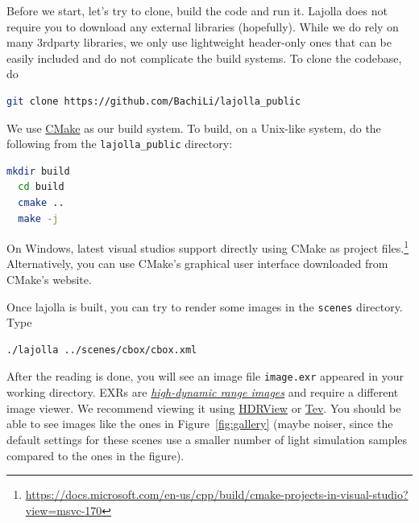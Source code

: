 Before we start, let's try to clone, build the code and run it. Lajolla does not require you to download any external libraries (hopefully). While we do rely on many 3rdparty libraries, we only use lightweight header-only ones that can be easily included and do not complicate the build systems. To clone the codebase, do
\begin{lstlisting}[language=bash]
  git clone https://github.com/BachiLi/lajolla_public
\end{lstlisting}

We use \href{https://cmake.org/}{CMake} as our build system. To build, on a Unix-like system, do the following from the \lstinline{lajolla_public} directory:

\begin{lstlisting}[language=bash]
  mkdir build
  cd build
  cmake ..
  make -j
\end{lstlisting}

On Windows, latest visual studios support directly using CMake as project files.\footnote{\url{https://docs.microsoft.com/en-us/cpp/build/cmake-projects-in-visual-studio?view=msvc-170}} Alternatively, you can use CMake's graphical user interface downloaded from CMake's website. 



Once lajolla is built, you can try to render some images in the \lstinline{scenes} directory. Type
\begin{lstlisting}[language=bash]
  ./lajolla ../scenes/cbox/cbox.xml
\end{lstlisting}

After the reading is done, you will see an image file \lstinline{image.exr} appeared in your working directory. EXRs are \href{https://en.wikipedia.org/wiki/High_dynamic_range}{\emph{high-dynamic range images}} and require a different image viewer. We recommend viewing it using \href{https://github.com/wkjarosz/hdrview}{HDRView} or \href{https://github.com/Tom94/tev}{Tev}. You should be able to see images like the ones in Figure~\ref{fig:gallery} (maybe noiser, since the default settings for these scenes use a smaller number of light simulation samples compared to the ones in the figure).

